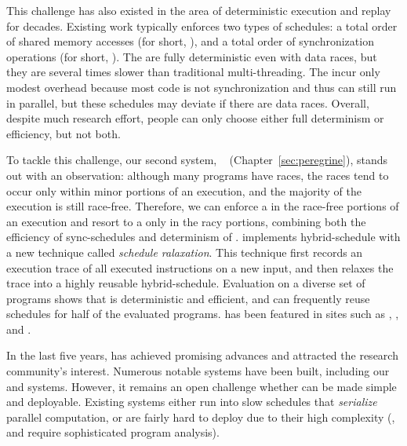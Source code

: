  This challenge has also existed in the area of deterministic
execution and replay for decades. Existing work typically enforces two types of
schedules: a total order of shared memory accesses (for short, \memsched), and a
total order of synchronization operations (for short, \syncsched). The
\memscheds are fully deterministic even with data races, but they are several
times slower than traditional multi-threading. The \syncscheds incur only modest
overhead because most code is not synchronization and thus can still run in
parallel, but these schedules may deviate if there are data races. Overall,
despite much research effort, people can only choose either full determinism or
efficiency, but not both.

To tackle this challenge, our second \smt system,
\peregrine~\cite{peregrine:sosp11} (Chapter~\ref{sec:peregrine}), stands out
with an observation: although many programs have races, the races tend to occur
only within minor portions of an execution, and the majority of the execution is
still race-free. Therefore, we can enforce a \syncscheds in the race-free
portions of an execution and resort to a \memsched only in the racy portions,
combining both the efficiency of sync-schedules and determinism of \memscheds. 
\peregrine implements hybrid-schedule with a new technique called \emph{schedule
ralaxation}. This technique first records an execution trace of all executed
instructions on a new input, and then relaxes the trace into a highly reusable
hybrid-schedule. Evaluation on a diverse set of programs shows that \peregrine
is deterministic and efficient, and can frequently reuse schedules for half of
the evaluated programs. \peregrine has been featured in sites such as
\acmtechnews, \tgdaily, and \physorg.

 In the last five
years, \smt has achieved promising advances and attracted the research
community's interest. Numerous notable \smt systems have been built, including
our \tern and  \peregrine systems. However, it remains an open challenge whether
\smt can be made simple and deployable. Existing \smt systems either run into
slow schedules that \emph{serialize} parallel computation, or are fairly hard to
deploy due to their high complexity (\eg, \tern and \peregrine require
sophisticated program analysis).

